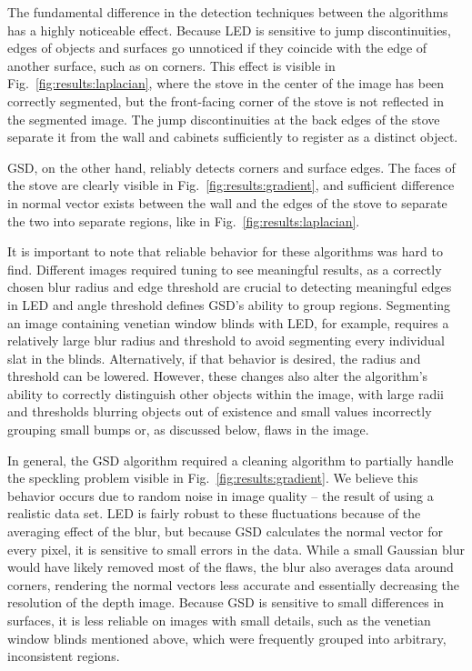 The fundamental difference in the detection techniques between the algorithms has a highly noticeable effect. Because LED is sensitive to jump discontinuities, edges of objects and surfaces go unnoticed if they coincide with the edge of another surface, such as on corners. This effect is visible in Fig.~\ref{fig:results:laplacian}, where the stove in the center of the image has been correctly segmented, but the front-facing corner of the stove is not reflected in the segmented image. The jump discontinuities at the back edges of the stove separate it from the wall and cabinets sufficiently to register as a distinct object.

GSD, on the other hand, reliably detects corners and surface edges. The faces of the stove are clearly visible in Fig.~\ref{fig:results:gradient}, and sufficient difference in normal vector exists between the wall and the edges of the stove to separate the two into separate regions, like in Fig.~\ref{fig:results:laplacian}. 

It is important to note that reliable behavior for these algorithms was hard to find. Different images required tuning to see meaningful results, as a correctly chosen blur radius and edge threshold are crucial to detecting meaningful edges in LED and angle threshold defines GSD's ability to group regions. Segmenting an image containing venetian window blinds with LED, for example, requires a relatively large blur radius and threshold to avoid segmenting every individual slat in the blinds. Alternatively, if that behavior is desired, the radius and threshold can be lowered. However, these changes also alter the algorithm's ability to correctly distinguish other objects within the image, with large radii and thresholds blurring objects out of existence and small values incorrectly grouping small bumps or, as discussed below, flaws in the image.

In general, the GSD algorithm required a cleaning algorithm to partially handle the speckling problem visible in Fig.~\ref{fig:results:gradient}. We believe this behavior occurs due to random noise in image quality -- the result of using a realistic data set. LED is fairly robust to these fluctuations because of the averaging effect of the blur, but because GSD calculates the normal vector for every pixel, it is sensitive to small errors in the data. While a small Gaussian blur would have likely removed most of the flaws, the blur also averages data around corners, rendering the normal vectors less accurate and essentially decreasing the resolution of the depth image. Because GSD is sensitive to small differences in surfaces, it is less reliable on images with small details, such as the venetian window blinds mentioned above, which were frequently grouped into arbitrary, inconsistent regions.
